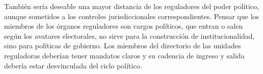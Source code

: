 \documentclass[
  12pt,
  spanish,
]{book}
\begin{document}
También sería deseable una mayor distancia de los reguladores del poder político, aunque sometidos a los controles jurisdiccionales correspondientes. Pensar que los miembros de los órganos reguladores son cargos políticos, que entran o salen según los avatares electorales, no sirve para la construcción de institucionalidad, sino para políticas de gobierno. Los miembros del directorio de las unidades reguladoras deberían tener mandatos claros y su cadencia de ingreso y salida debería estar desvinculada del ciclo político.

  
\end{document}
